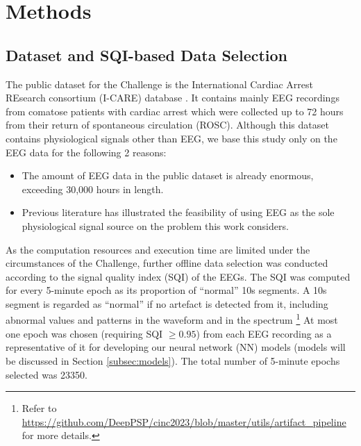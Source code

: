 \section{Methods}
\label{sec:methods}


\subsection{Dataset and SQI-based Data Selection}
\label{subsec:data_selection}

The public dataset for the Challenge is the International Cardiac Arrest REsearch consortium (I-CARE) database \cite{Amorim_2023_ICAREDatabase}. It contains mainly EEG recordings from comatose patients with cardiac arrest which were collected up to 72 hours from their return of spontaneous circulation (ROSC). Although this dataset contains physiological signals other than EEG, we base this study only on the EEG data for the following 2 reasons:
\begin{itemize}
    \item The amount of EEG data in the public dataset is already enormous, exceeding 30,000 hours in length.
    \item Previous literature \cite{Zheng_2021_coma} has illustrated the feasibility of using EEG as the sole physiological signal source on the problem this work considers.
\end{itemize}

As the computation resources and execution time are limited under the circumstances of the Challenge, further offline data selection was conducted according to the signal quality index (SQI) of the EEGs. The SQI was computed for every 5-minute epoch as its proportion of ``normal'' 10s segments. A 10s segment is regarded as ``normal'' if no artefact is detected from it, including abnormal values and patterns in the waveform and in the spectrum \footnote{Refer to \url{https://github.com/DeepPSP/cinc2023/blob/master/utils/artifact_pipeline} for more details.}
At most one epoch was chosen (requiring SQI $\ge 0.95$) from each EEG recording as a representative of it for developing our neural network (NN) models (models will be discussed in Section \ref{subsec:models}). The total number of 5-minute epochs selected was 23350.



